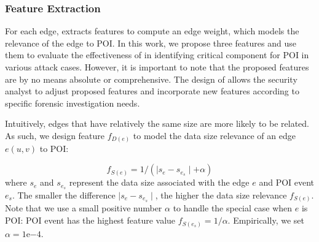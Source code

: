 




\subsubsection{Feature Extraction}
\label{subsubsec:feature-extraction}

For each edge, \tool extracts features to compute an edge weight, which models the relevance of the edge to POI.
In this work, we propose three features and use them to evaluate the effectiveness of \tool in identifying critical component for POI in various attack cases.
%
However, it is important to note that the proposed features are by no means absolute or comprehensive.
The design of \tool allows the security analyst to adjust proposed features and incorporate new features according to specific forensic investigation needs.





Intuitively, edges that have relatively the same size are more likely to be related.
As such, we design feature $f_{D(e)}$ to model the data size relevance of an edge $e(u, v)$ to POI:

\begin{equation}
\label{eq:data-feature}
    f_{S(e)} = 1/(\mid s_{e} - s_{e_s}\mid + \alpha)
\end{equation}
where $s_{e}$ and $s_{e_s}$ represent the data size associated with the edge $e$ and POI event $e_s$.
The smaller the difference $\mid s_{e} - s_{e_s}\mid$, the higher the data size relevance $f_{S(e)}$.
%
Note that we use a small positive number $\alpha$ to handle the special case when $e$ is POI: POI event has the highest feature value $f_{S(e_s)} = 1/\alpha$.
Empirically, we set $\alpha = 1\mathrm{e}{-4}$.


